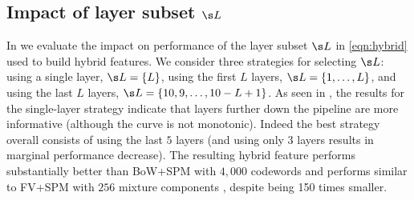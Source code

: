 \documentclass{article}
\begin{document}


\subsection{Impact of layer subset $\s L$}
\label{sec:cases}
In  we evaluate the impact on performance of the layer subset $\s L$ in \eqref{eqn:hybrid} used to build hybrid features. We consider three strategies for selecting $\s L$: using a single layer, $\s L=\{L\}$, using the first $L$ layers, $\s L=\{1,\ldots,L\}$, and using the last $L$ layers, $\s L=\{10,9,\ldots,10-L+1\}$. As seen in , the results for the single-layer strategy indicate that layers further down the pipeline are more informative (although the curve is not monotonic). Indeed the best strategy overall consists of using the last $5$ layers (and using only $3$ layers results in marginal performance decrease). The resulting hybrid feature performs substantially better than BoW+SPM with $4,000$ codewords and performs similar to FV+SPM with $256$ mixture components \cite{perronnin}, despite being 150 times smaller. 
\end{document}
